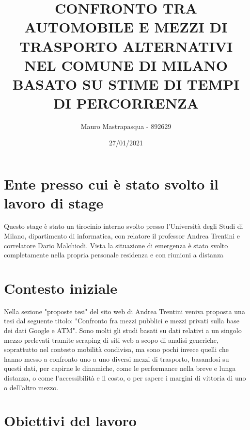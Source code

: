 \documentclass{article}
\title{{\Large\textbf{CONFRONTO TRA AUTOMOBILE E MEZZI DI TRASPORTO ALTERNATIVI NEL COMUNE DI MILANO BASATO SU STIME DI TEMPI DI PERCORRENZA}}}
\author{\LARGE{Mauro Mastrapasqua - 892629}}
\date{\Large{27/01/2021}}
\begin{document}
	\maketitle
	\vspace{1cm}
	
\section{Ente presso cui è stato svolto il lavoro di stage}

\large{
Questo stage è stato un tirocinio interno svolto presso l'Università degli Studi di Milano, dipartimento di informatica, con relatore il professor Andrea Trentini e correlatore Dario Malchiodi. Vista la situazione di emergenza è stato svolto completamente nella propria personale residenza e con riunioni a distanza
}

\section{Contesto iniziale}

\large{
Nella sezione "proposte tesi" del sito web di Andrea Trentini veniva proposta una tesi dal seguente titolo: "Confronto fra mezzi pubblici e mezzi privati sulla base dei dati Google e ATM". Sono molti gli studi basati su dati relativi a un singolo mezzo prelevati tramite scraping di siti web a scopo di analisi generiche, soprattutto nel contesto mobilità condivisa, ma sono pochi invece quelli che hanno messo a confronto uno a uno diversi mezzi di trasporto, basandosi su questi dati, per capirne le dinamiche, come le performance nella breve e lunga distanza, o come l'accessibilità e il costo, o per sapere i margini di vittoria di uno o dell'altro mezzo.
}

\section{Obiettivi del lavoro}

\large{

}












	
\end{document}
